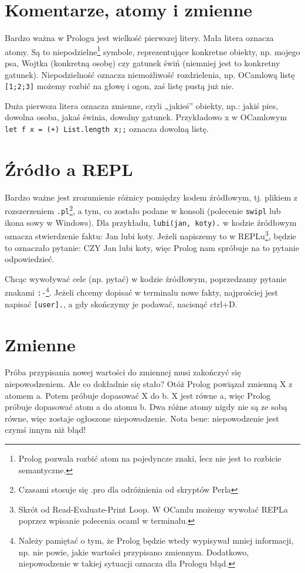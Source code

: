 \documentclass[12pt,a4paper]{article}
\begin{document}
\section{Komentarze, atomy i zmienne}
Bardzo ważna w Prologu jest wielkość pierwszej litery. Mała litera oznacza atomy. Są to niepodzielne\footnote{Prolog pozwala rozbić atom na pojedyncze znaki, lecz nie jest to rozbicie semantyczne.} symbole, reprezentujące konkretne obiekty, np. mojego psa, Wojtka (konkretną osobę) czy gatunek świń (niemniej jest to konkretny gatunek). Niepodzielność oznacza niemożliwość rozdzielenia, np. OCamlową listę \verb![1;2;3]! możemy rozbić na głowę i ogon, zaś listę pustą już nie.

Duża pierwsza litera oznacza zmienne, czyli „jakieś” obiekty, np.: jakiś pies, dowolna osoba, jakaś świnia, dowolny gatunek. Przykładowo x w OCamlowym \verb!let f x = (+) List.length x;;! oznacza dowolną listę.

\section{Źródło a REPL}
Bardzo ważne jest zrozumienie różnicy pomiędzy kodem źródłowym, tj. plikiem z rozszerzeniem \verb+.pl+\footnote{Czasami stosuje się .pro dla odróżnienia od skryptów Perla}, a tym, co zostało podane w konsoli (polecenie \verb!swipl! lub ikona sowy w Windows). Dla przykładu, \verb!lubi(jan, koty).! w kodzie źródłowym oznacza stwierdzenie faktu: Jan lubi koty. Jeżeli napiszemy to w REPLu\footnote{Skrót od Read-Evaluate-Print Loop. W OCamlu możemy wywołać REPLa poprzez wpisanie polecenia ocaml w terminalu.}, będzie to oznaczało pytanie: CZY Jan lubi koty, więc Prolog nam spróbuje na to pytanie odpowiedzieć.

Chcąc wywoływać cele (np. pytać) w kodzie źródłowym, poprzedzamy pytanie znakami \verb+:-+\footnote{Należy pamiętać o tym, że Prolog będzie wtedy wypisywał mniej informacji, np. nie powie, jakie wartości przypisano zmiennym. Dodatkowo, niepowodzenie w takiej sytuacji oznacza dla Prologu błąd.}. Jeżeli chcemy dopisać w terminalu nowe fakty, najprościej jest napisać \verb+[user].+, a gdy skończymy je podawać, nacisnąć ctrl+D.

\section{Zmienne}
Próba przypisania nowej wartości do zmiennej musi zakończyć się niepowodzeniem. Ale co dokładnie się stało? Otóż Prolog powiązał zmienną X z atomem a. Potem próbuje dopasować X do b. X jest równe a, więc Prolog próbuje dopasować atom a do atomu b. Dwa różne atomy nigdy nie są ze sobą równe, więc zostaje ogłoszone niepowodzenie. Nota bene: niepowodzenie jest czymś innym niż błąd!
\end{document}

